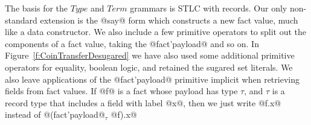 The basis for the $Type$ and $Term$ grammars is STLC with records. Our only non-standard extension is the @say@ form which constructs a new fact value, much like a data constructor. We also include a few primitive operators to split out the components of a fact value, taking the @fact'payload@ and so on. In Figure~\ref{f:CoinTransferDesugared} we have also used some additional primitive operators for equality, boolean logic, and retained the sugared set literals. We also leave applications of the @fact'payload@ primitive implicit when retrieving fields from fact values. If @f@ is a fact whose payload has type $\tau$, and $\tau$ is a record type that includes a field with label @x@, then we just write @f.x@ instead of @(fact'payload@$_\tau$ @f).x@



